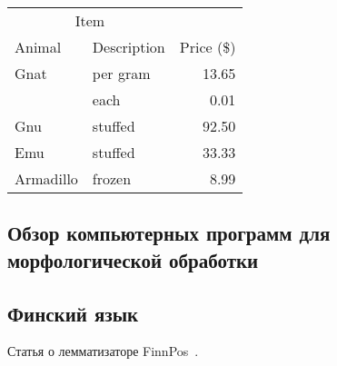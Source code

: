
\newpage\clearpage


\begin{tabular}{llr}
\hline
\multicolumn{2}{c}{Item} \\
\cline{1-2}
Animal    & Description & Price (\$) \\
\hline
Gnat      & per gram    & 13.65      \\
          & each        & 0.01       \\
Gnu       & stuffed     & 92.50      \\
Emu       & stuffed     & 33.33      \\
Armadillo & frozen      & 8.99       \\
\hline
\end{tabular}



\bigskip
\bigskip





\subsection{Обзор компьютерных программ для морфологической обработки}

\subsection{Финский язык}\label{sect_review_fin}

Статья о лемматизаторе FinnPos~\cite{silfverberg2016finnpos}.



\bigskip
\bigskip
